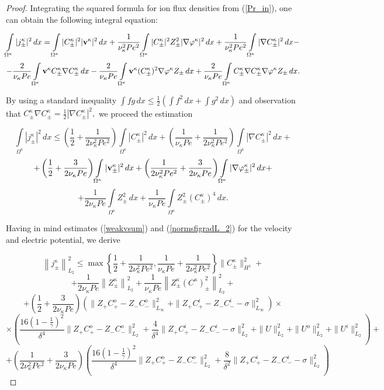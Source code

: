 \documentclass{amsart}
\begin{document}
\begin{proof}
Integrating the squared formula for ion flux densities from (\ref{Pr_in}), one can obtain the following integral equation:

$$\int\limits_{\Omega^{\kappa}}|j^{\kappa}_{\pm}|^2\,dx=\int\limits_{\Omega^{\kappa}}|C^{\kappa}_{\pm}|^2|{\bold v}^{\kappa}|^2\,dx+\frac{1}{\nu^2_{\kappa}Pe^2}\int\limits_{\Omega^{\kappa}}|C^{\kappa}_{\pm}|^2Z^2_{\pm}|\nabla\varphi^{\kappa}|^2\,dx+\frac{1}{\nu^2_{\kappa}Pe^2}\int\limits_{\Omega^{\kappa}}|\nabla C^{\kappa}_{\pm}|^2\,dx-$$
$$-\frac{2}{\nu_{\kappa}Pe}\int\limits_{\Omega^{\kappa}}{\bold v}^{\kappa}C^{\kappa}_{\pm}\nabla C^{\kappa}_{\pm}\,dx-\frac{2}{\nu_{\kappa}Pe}\int\limits_{\Omega^{\kappa}}{\bold v}^{\kappa}(C^{\kappa}_{\pm})^2\nabla {\varphi}^{\kappa}Z_{\pm}\,dx+\frac{2}{\nu_{\kappa}Pe}\int\limits_{\Omega^{\kappa}}C^{\kappa}_{\pm}\nabla C^{\kappa}_{\pm}\nabla {\varphi}^{\kappa}Z_{\pm}\,dx.$$

By using a standard inequality $\int fg\,dx\leq \frac{1}{2}\left(\int f^2\,dx+ \int g^2\,dx\right)$ and observation that $C^{\kappa}_{\pm}\nabla C^{\kappa}_{\pm}=\frac{1}{2}|\nabla C^{\kappa}_{\pm}|^2,$ we proceed the estimation

$$\int\limits_{\Omega^{\kappa}}|j^{\kappa}_{\pm}|^2\,dx\leq\left(\frac{1}{2}+\frac{1}{2\nu^2_{\kappa}Pe^2}\right)\int\limits_{\Omega^{\kappa}}|C^{\kappa}_{\pm}|^2\,dx+\left(\frac{1}{\nu_{\kappa}Pe}+\frac{1}{2\nu^2_{\kappa}Pe^2}\right)\int\limits_{\Omega^{\kappa}}|\nabla C^{\kappa}_{\pm}|^2\,dx+$$
$$+\left(\frac{1}{2}+\frac{3}{2\nu_{\kappa}Pe}\right)\int\limits_{\Omega^{\kappa}}| {\bold v}^{\kappa}_{\pm}|^2\,dx+\left(\frac{1}{2\nu^2_{\kappa}Pe^2}+\frac{3}{2\nu_{\kappa}Pe}\right)\int\limits_{\Omega^{\kappa}}| \nabla{\varphi}^{\kappa}_{\pm}|^2\,dx+$$
$$+\frac{1}{2\nu_{\kappa}Pe}\int\limits_{\Omega^{\kappa}}Z^2_{\pm}\,dx+\frac{1}{\nu_{\kappa}Pe}\int\limits_{\Omega^{\kappa}}Z^2_{\pm}(C^{\kappa}_{\pm})^4\,dx.$$


Having in mind estimates (\ref{weakvsum}) and (\ref{normsfigradL_2}) for the velocity and electric potential, we derive 


$$
\left\|j^{\kappa}_{\pm}\right\|^2_{L_2}\leq \max{\left\lbrace\frac{1}{2}+\frac{1}{2\nu_{\kappa}^2Pe^2},\frac{1}{\nu_{\kappa}Pe}+\frac{1}{2\nu_{\kappa}^2Pe^2}\right\rbrace}\|C^{\kappa}_{\pm}\|^2_{H^1}+$$
$$+\frac{1}{2\nu_{\kappa}Pe}\left\|Z^{\kappa}_{\pm}\right\|^2_{L_2}+\frac{1}{\nu_{\kappa}Pe}\left\|Z^{\kappa}_{\pm}(C^{\kappa})^2_{\pm}\right\|^2_{L_2}+ $$
$$+\left(\frac{1}{2}+\frac{3}{2\nu_{\kappa}Pe}\right)\left(\|Z_{+}C^{o}_{+}-Z_{-}C^{o}_{-}\|_{L_{\infty}}^2+\|Z_{+}C^{i}_{+}-Z_{-}C^{i}_{-}-\sigma\|_{L_{\infty}}^2\right)\times
$$
$$\times\left(\frac{16\left(1-\frac{1}{\gamma}\right)^2}{\delta^4}\|Z_{+}C^{o}_{+}-Z_{-}C^{o}_{-}\|_{L_2}^2+\frac{4}{\delta^4}\|Z_{+}C^{i}_{+}-Z_{-}C^{i}_{-}-\sigma\|_{L_2}^2+
\|U\|_{L_2}^2+\|U^o\|_{L_2}^2+\|U^i\|_{L_2}^2\right)+$$
$$+\left(\frac{1}{2\nu^2_{\kappa}Pe^2}+\frac{3}{2\nu_{\kappa}Pe}\right)\left(\frac{16\left(1-\frac{1}{\gamma}\right)^2}{\delta^4}\|Z_{+}C^{o}_{+}-Z_{-}C^{o}_{-}\|_{L_2}^2+\frac{8}{\delta^2}\|Z_{+}C^{i}_{+}-Z_{-}C^{i}_{-}-\sigma\|_{L_2}^2\right)$$






\end{proof}
\end{document}
